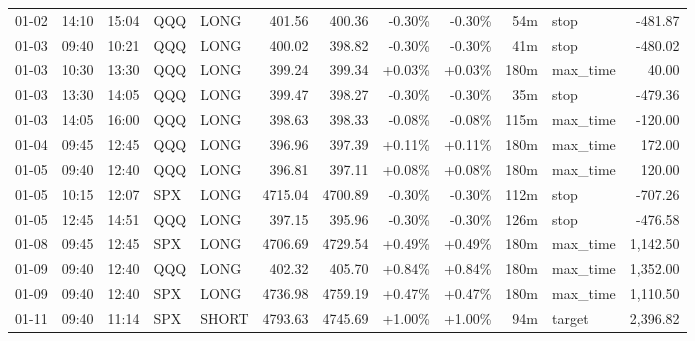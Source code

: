 \documentclass[11pt,a4paper,twoside]{article}
\begin{document}
\begin{center}
\begin{longtable}{>{\color{txtmain}}l l l l l r r r r r >{\color{txtmain}}l r}
01-02 & 14:10 & 15:04 & QQQ & LONG & 401.56 & 400.36 & \textcolor{lossred}{-0.30\%} & \textcolor{lossred}{-0.30\%} & 54m & stop & \textcolor{lossred}{-481.87} \\
01-03 & 09:40 & 10:21 & QQQ & LONG & 400.02 & 398.82 & \textcolor{lossred}{-0.30\%} & \textcolor{lossred}{-0.30\%} & 41m & stop & \textcolor{lossred}{-480.02} \\
01-03 & 10:30 & 13:30 & QQQ & LONG & 399.24 & 399.34 & \textcolor{wingreen}{+0.03\%} & \textcolor{wingreen}{+0.03\%} & 180m & max\_time & \textcolor{wingreen}{40.00} \\
01-03 & 13:30 & 14:05 & QQQ & LONG & 399.47 & 398.27 & \textcolor{lossred}{-0.30\%} & \textcolor{lossred}{-0.30\%} & 35m & stop & \textcolor{lossred}{-479.36} \\
01-03 & 14:05 & 16:00 & QQQ & LONG & 398.63 & 398.33 & \textcolor{lossred}{-0.08\%} & \textcolor{lossred}{-0.08\%} & 115m & max\_time & \textcolor{lossred}{-120.00} \\
01-04 & 09:45 & 12:45 & QQQ & LONG & 396.96 & 397.39 & \textcolor{wingreen}{+0.11\%} & \textcolor{wingreen}{+0.11\%} & 180m & max\_time & \textcolor{wingreen}{172.00} \\
01-05 & 09:40 & 12:40 & QQQ & LONG & 396.81 & 397.11 & \textcolor{wingreen}{+0.08\%} & \textcolor{wingreen}{+0.08\%} & 180m & max\_time & \textcolor{wingreen}{120.00} \\
01-05 & 10:15 & 12:07 & SPX & LONG & 4715.04 & 4700.89 & \textcolor{lossred}{-0.30\%} & \textcolor{lossred}{-0.30\%} & 112m & stop & \textcolor{lossred}{-707.26} \\
01-05 & 12:45 & 14:51 & QQQ & LONG & 397.15 & 395.96 & \textcolor{lossred}{-0.30\%} & \textcolor{lossred}{-0.30\%} & 126m & stop & \textcolor{lossred}{-476.58} \\
01-08 & 09:45 & 12:45 & SPX & LONG & 4706.69 & 4729.54 & \textcolor{wingreen}{+0.49\%} & \textcolor{wingreen}{+0.49\%} & 180m & max\_time & \textcolor{wingreen}{1,142.50} \\
01-09 & 09:40 & 12:40 & QQQ & LONG & 402.32 & 405.70 & \textcolor{wingreen}{+0.84\%} & \textcolor{wingreen}{+0.84\%} & 180m & max\_time & \textcolor{wingreen}{1,352.00} \\
01-09 & 09:40 & 12:40 & SPX & LONG & 4736.98 & 4759.19 & \textcolor{wingreen}{+0.47\%} & \textcolor{wingreen}{+0.47\%} & 180m & max\_time & \textcolor{wingreen}{1,110.50} \\
01-11 & 09:40 & 11:14 & SPX & SHORT & 4793.63 & 4745.69 & \textcolor{wingreen}{+1.00\%} & \textcolor{wingreen}{+1.00\%} & 94m & target & \textcolor{wingreen}{2,396.82} \\

\end{longtable}
\end{center}
\end{document}
